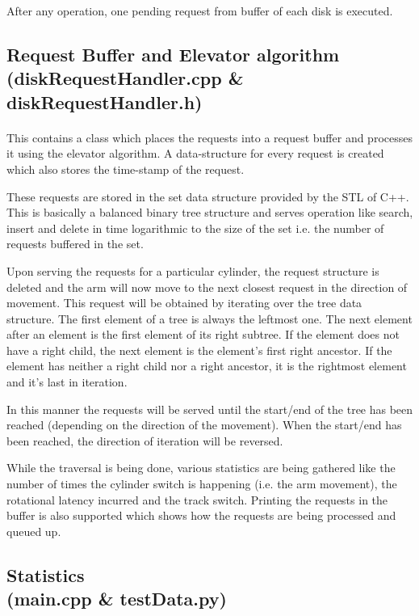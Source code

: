 \documentclass[11pt]{article}
\begin{document}
After any operation, one pending request from buffer of each disk is executed.

\subsection{Request Buffer and Elevator algorithm \\ (diskRequestHandler.cpp \& diskRequestHandler.h)}
\paragraph{}

This contains a class which places the requests into a request buffer and processes it using the elevator algorithm. A data-structure for every request is created which also stores the time-stamp of the request.

These requests are stored in the set data structure provided by the STL of C++. This is basically a balanced binary tree structure and serves operation like search, insert and delete in time logarithmic to the size of the set i.e. the number of requests buffered in the set.

Upon serving the requests for a particular cylinder, the request structure is deleted and the arm will now move to the next closest request in the direction of movement. This request will be obtained by iterating over the tree data structure. The first element of a tree is always the leftmost one. The next element after an element is the first element of its right subtree. If the element does not have a right child, the next element is the element's first right ancestor. If the element has neither a right child nor a right ancestor, it is the rightmost element and it's last in iteration. 

In this manner the requests will be served until the start/end of the tree has been reached (depending on the direction of the movement). When the start/end has been reached, the direction of iteration will be reversed.

While the traversal is being done, various statistics are being gathered like the number of times the cylinder switch is happening (i.e. the arm movement), the rotational latency incurred and the track switch. Printing the requests in the buffer is also supported which shows how the requests are being processed and queued up.

\subsection{Statistics \\ (main.cpp \& testData.py)}
\end{document}
